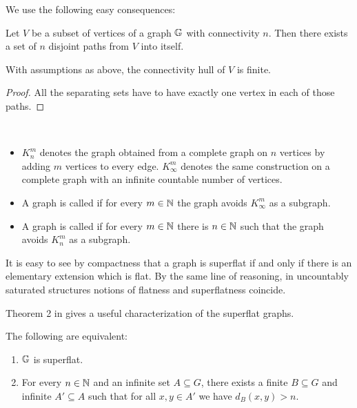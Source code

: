 We use the following easy consequences:

\begin{Corollary} \label{cr_disjoint_paths}
  Let $V$ be a subset of vertices of a graph $\mathbb G$ with connectivity $n$. Then there exists a set of $n$ disjoint paths from $V$ into itself.
\end{Corollary}

\begin{Corollary} \label{cr_hull_finite}
  With assumptions as above, the connectivity hull of $V$ is finite.
\end{Corollary}

\begin{proof}
  All the separating sets have to have exactly one vertex in each of those paths. 
\end{proof}

\begin{Definition} \ 
  \begin{itemize}
  \item $K^m_n$ denotes the graph obtained from a complete graph on $n$ vertices by adding $m$ vertices to every edge.
    $K^m_\infty$ denotes the same construction on a complete graph with an infinite countable number of vertices.
    \item A graph is called \defn{flat} if for every $m \in \mathbb{N}$ the graph avoids $K^m_\infty$ as a subgraph. 
    \item A graph is called \defn{superflat} if for every $m \in \mathbb{N}$ there is $n \in \mathbb{N}$ such that the graph avoids $K^m_n$ as a subgraph. 
  \end{itemize}
\end{Definition}
It is easy to see by compactness that a graph is superflat if and only if there is an elementary extension which is flat.
By the same line of reasoning, in uncountably saturated structures notions of flatness and superflatness coincide.

Theorem 2 in \cite{stable_graphs} gives a useful characterization of the superflat graphs.

\begin{Theorem} \label{th_superflat_equivalence}
  The following are equivalent:
  \begin{enumerate}
  \item $\mathbb G$ is superflat.
  \item For every $n \in \mathbb{N}$ and an infinite set $A \subseteq G$, there exists a finite $B \subseteq G$ and infinite $A' \subseteq A$ such that for all $x,y \in A'$ we have $d_{B}(x, y) > n$.
  \end{enumerate}
\end{Theorem}

